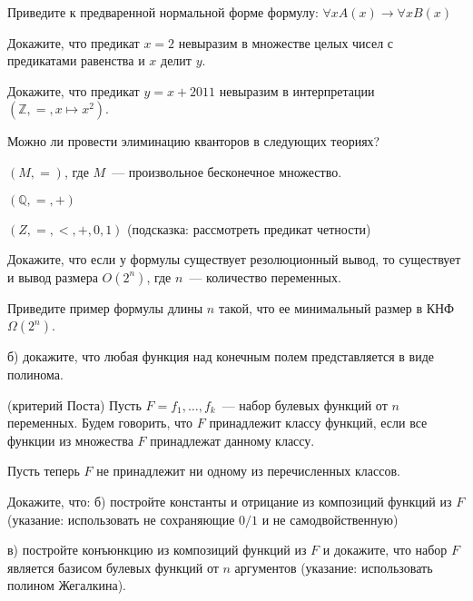 \setcounter{curtask}{38}


\begin{task}
    Приведите к предваренной нормальной форме формулу:
    $\forall x A(x) \rightarrow \forall x B(x)$
\end{task}

\begin{task}
    Докажите, что предикат $x = 2$ невыразим в множестве целых чисел с
    предикатами равенства и $x$ делит $y$.
\end{task}

\begin{task}
    Докажите, что предикат $y = x + 2011$ невыразим в интерпретации
    $(\mathbb{Z}, =, x \mapsto x^2)$.
\end{task}

Можно ли провести элиминацию кванторов в следующих теориях?

\begin{task}
    $(M, =)$, где $M$~--- произвольное бесконечное множество.
\end{task}

\begin{task}
    $(\mathbb{Q}, =, +)$
\end{task}

\begin{task}
    $(Z, =, <, +, 0, 1)$ (подсказка: рассмотреть предикат четности)
\end{task}

\breakline

\begin{ptask}{33}
    Докажите, что если у формулы существует резолюционный вывод, то
    существует и вывод размера $O(2^n)$, где $n$~--- количество переменных.
\end{ptask}

\begin{ptask}{34}
    Приведите пример формулы длины $n$ такой, что ее минимальный
    размер в КНФ $\Omega(2^n)$.
\end{ptask}

\begin{ptask}{36}
    б) докажите, что любая функция над конечным полем представляется в
	виде полинома.
\end{ptask}

\begin{task} (критерий Поста)
	Пусть $F = {f_1, \dots, f_k}$~--- набор булевых функций от $n$
    переменных. Будем говорить, что $F$ принадлежит классу функций,
    если все функции из множества $F$ принадлежат данному классу.
    
    Пусть теперь $F$ не принадлежит ни одному из перечисленных
    классов.

    Докажите, что:
    б) постройте константы и отрицание из композиций функций из $F$
    (указание: использовать не сохраняющие $0/1$ и не самодвойственную)

    в) постройте конъюнкцию из композиций функций из $F$ и докажите,
    что набор $F$ является базисом булевых функций от $n$ аргументов
    (указание: использовать полином Жегалкина).

\end{task}